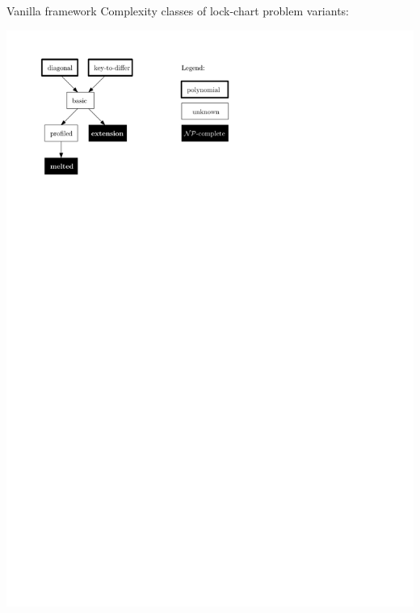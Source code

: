 \begin{frame}{Vanilla framework}
  Complexity classes of lock-chart problem variants:
  \begin{center}
    \includegraphics[width=.7\textwidth]{LockChartHierarchy.pdf}  
  \end{center}
\end{frame}



